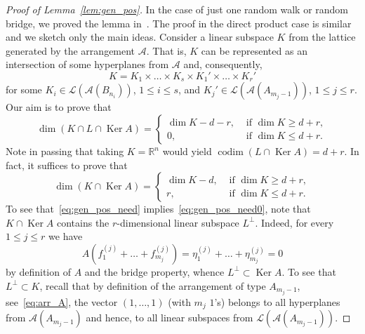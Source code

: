 \documentclass[12pt, reqno]{amsart}
\theoremstyle{plain}
\theoremstyle{definition}
\theoremstyle{remark}
\begin{document}
\begin{proof}[Proof of Lemma~\ref{lem:gen_pos}]
In the case of just one random walk or random bridge, we proved the lemma in~\cite[Section 4.2]{KVZ16_arcsine}. The proof in the direct product case is similar and we sketch only the main ideas. Consider a linear subspace $K$ from the lattice generated by the arrangement ${\mathcal{A}}$. That is, $K$ can be represented as an intersection of some hyperplanes from ${\mathcal{A}}$ and, consequently,
\begin{equation}\label{eq:K_product}
K= K_1\times \ldots \times K_{s} \times K_1'\times \ldots \times K_r'
\end{equation}
for some $K_i\in {\mathcal{L}}({\mathcal{A}}(B_{n_i}))$, $1\leq i\leq s$, and $K_j'\in {\mathcal{L}}({\mathcal{A}}(A_{m_j-1}))$, $1\leq j\leq r$.
Our aim is to prove that
\begin{equation}\label{eq:gen_pos_need0}
\dim (K\cap L \cap \operatorname*{Ker} A) =
\begin{cases}
\dim K - d - r, & \text{ if } \dim K \geq d+r,\\
0, & \text{ if } \dim K \leq d+r.
\end{cases}
\end{equation}
Note in passing that taking $K={\mathbb{R}}^n$ would yield ${\mathop{\mathrm{codim}}\nolimits} (L \cap \operatorname*{Ker} A)= d+r$.  In fact, it suffices to prove that
\begin{equation}\label{eq:gen_pos_need}
\dim (K\cap \operatorname*{Ker} A) =
\begin{cases}
\dim K - d, & \text{ if } \dim K \geq d+r,\\
r, & \text{ if } \dim K \leq d+r.
\end{cases}
\end{equation}
To see that~\eqref{eq:gen_pos_need} implies~\eqref{eq:gen_pos_need0}, note that $K\cap \operatorname*{Ker} A$ contains the $r$-dimensional linear subspace $L^{\bot}$. Indeed, for every $1\leq j\leq r$ we have
$$
A(f_1^{(j)} + \ldots + f_{m_j}^{(j)}) = \eta_1^{(j)} + \ldots + \eta_{m_j}^{(j)} = 0
$$
by definition of $A$ and the bridge property, whence $L^{\bot} \subset \operatorname*{Ker} A$. To see that $L^{\bot} \subset K$, recall that by definition of the arrangement of type $A_{m_j-1}$, see~\eqref{eq:arr_A}, the vector $(1,\ldots,1)$ (with $m_j$ $1$'s) belongs to all hyperplanes from ${\mathcal{A}}(A_{m_j-1})$ and hence, to all linear subspaces from ${\mathcal{L}}({\mathcal{A}}(A_{m_j-1}))$.


\end{proof}
\end{document}
